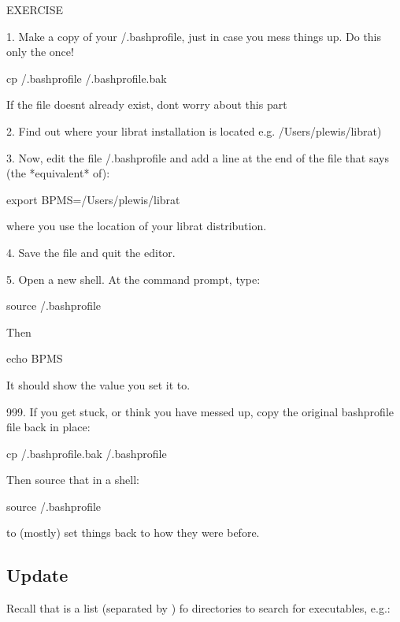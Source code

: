 \documentclass[letterpaper,10pt,english]{sphinxmanual}
\begin{document}
\begin{sphinxVerbatim}[commandchars=\\\{\}]
EXERCISE

    1. Make a copy of your \PYGZti{}/.bash\PYGZus{}profile, just in case you mess things up. Do this only the once!

        cp \PYGZti{}/.bash\PYGZus{}profile \PYGZti{}/.bash\PYGZus{}profile.bak

    If the file doesn\PYGZsq{}t already exist, don\PYGZsq{}t worry about this part

    2. Find out where your librat installation is located e.g. /Users/plewis/librat)

    3. Now, edit the file \PYGZti{}/.bash\PYGZus{}profile and add a line at the end of the file that says (the *equivalent* of):

        export BPMS=/Users/plewis/librat

    where you use the location of your librat distribution.

    4. Save the file and quit the editor.

    5. Open a new shell. At the command prompt, type:

            source \PYGZti{}/.bash\PYGZus{}profile

    Then

            echo \PYGZdl{}BPMS

    It should show the value you set it to.

    999. If you get stuck, or think you have messed up, copy the original bash\PYGZus{}profile file back in place:

        cp \PYGZti{}/.bash\PYGZus{}profile.bak \PYGZti{}/.bash\PYGZus{}profile

    Then source that in a shell:

        source \PYGZti{}/.bash\PYGZus{}profile

    to (mostly) set things back to how they were before.
\end{sphinxVerbatim}


\subsection{Update }
\label{\detokenize{Appendix1:Update-PATH}}
Recall that  is a list (separated by \sphinxcode{\sphinxupquote{:}}) fo directories to search for executables, e.g.:

\begin{sphinxVerbatim}[commandchars=\\\{\}]
\end{sphinxVerbatim}
\end{document}
